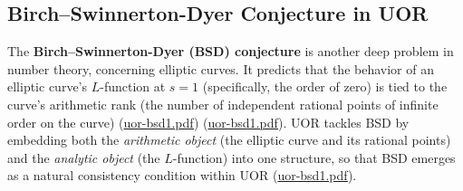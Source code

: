 \documentclass[12pt]{article}
\begin{document}
\subsection{Birch--Swinnerton-Dyer Conjecture in UOR}

The \textbf{Birch--Swinnerton-Dyer (BSD) conjecture} is another deep problem in number theory, concerning elliptic curves. It predicts that the behavior of an elliptic curve’s $L$-function at $s=1$ (specifically, the order of zero) is tied to the curve’s arithmetic rank (the number of independent rational points of infinite order on the curve) (\href{file://file-QX2RAaHV3sY1bCttwB4hkL#:~:text=%2A%2AClassical%20Statement%3A%2A%2A%20The%20Birch%E2%80%93Swinnerton,content%2Fuploads%2F2022%2F05%2Fbirchswin.pdf%23%3A~%3Atext%3DConjecture%2520}{uor-bsd1.pdf}) (\href{file://file-QX2RAaHV3sY1bCttwB4hkL#:~:text=content%2Fuploads%2F2022%2F05%2Fbirchswin.pdf%23%3A~%3Atext%3DConjecture,E%2C1%29%3D0%24%20if%20and%20only%20if}{uor-bsd1.pdf}). UOR tackles BSD by embedding both the \emph{arithmetic object} (the elliptic curve and its rational points) and the \emph{analytic object} (the $L$-function) into one structure, so that BSD emerges as a natural consistency condition within UOR (\href{file://file-QX2RAaHV3sY1bCttwB4hkL#:~:text=,E%24%20within%20a%20single%20coherent}{uor-bsd1.pdf}).

\medskip
\end{document}
